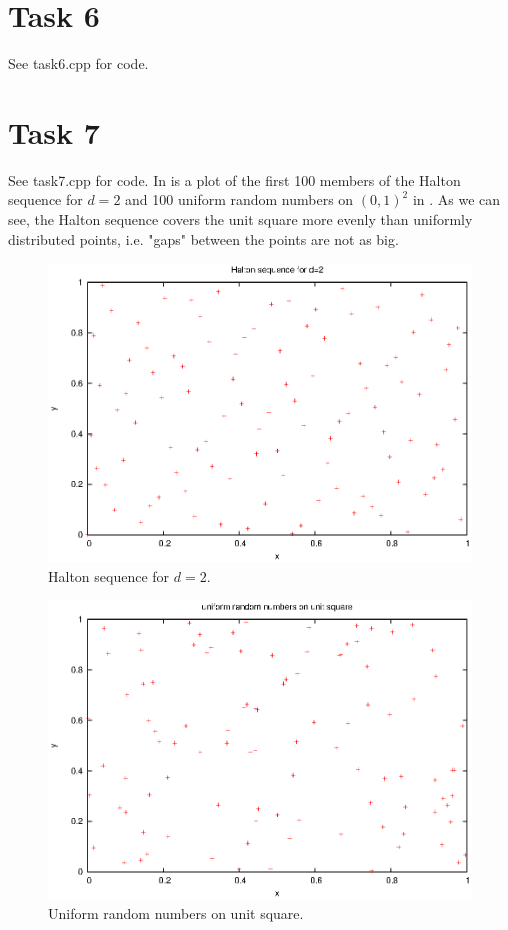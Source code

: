 \documentclass[]{article}
\begin{document}
\section*{Task 6}
See task6.cpp for code.

\section*{Task 7} See task7.cpp for code. In  is a plot of the
first 100 members of the Halton sequence for $d=2$ and 100 uniform random numbers on
$(0,1)^2$ in . As we can see, the Halton sequence covers the
unit square more evenly than uniformly distributed points, i.e. "gaps" between the points are not as
big.
\begin{figure}[!ht]
\includegraphics{task7_halton.eps}
\caption{Halton sequence for $d=2$.}
\label{fig:Task7a}
\end{figure}
\begin{figure}[!ht]
\includegraphics{task7_uniform.eps}
\caption{Uniform random numbers on unit square.}
\label{fig:Task7b}
\end{figure}
\clearpage
\end{document}
